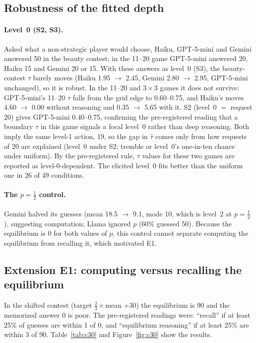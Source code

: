 \documentclass[11pt]{article}
\begin{document}
\subsection{Robustness of the fitted depth}
\paragraph{Level~0 (S2, S3).} Asked what a non-strategic player would choose, Haiku, GPT-5-mini and Gemini answered 50 in the beauty contest; in the 11--20 game GPT-5-mini answered 20, Haiku 15 and Gemini 20 or 15. With these answers as level~0 (S3), the beauty-contest $\tau$ barely moves (Haiku 1.95 $\to$ 2.45, Gemini 2.80 $\to$ 2.95, GPT-5-mini unchanged), so it is robust. In the 11--20 and $3{\times}3$ games it does not survive: GPT-5-mini's 11--20 $\tau$ falls from the grid edge to 0.60--0.75, and Haiku's moves 4.60 $\to$ 0.00 without reasoning and 0.35 $\to$ 5.65 with it. S2 (level~0 $=$ request 20) gives GPT-5-mini 0.40--0.75, confirming the pre-registered reading that a boundary $\tau$ in this game signals a focal level~0 rather than deep reasoning. Both imply the same level-1 action, 19, so the gap in $\hat\tau$ comes only from how requests of 20 are explained (level~0 under S2; tremble or level~0's one-in-ten chance under uniform). By the pre-registered rule, $\tau$ values for these two games are reported as level-0-dependent. The elicited level~0 fits better than the uniform one in 26 of 49 conditions.

\paragraph{The $p=\tfrac12$ control.} Gemini halved its guesses (mean 18.5 $\to$ 9.1, mode 10, which is level~2 at $p=\tfrac12$), suggesting computation; Llama ignored $p$ (60\% guessed 50). Because the equilibrium is 0 for both values of $p$, this control cannot separate computing the equilibrium from recalling it, which motivated E1.

\subsection{Extension E1: computing versus recalling the equilibrium}\label{sec:c30}
In the shifted contest (target $\tfrac23\times$mean $+30$) the equilibrium is 90 and the memorized answer 0 is poor. The pre-registered readings were: ``recall'' if at least 25\% of guesses are within 1 of 0, and ``equilibrium reasoning'' if at least 25\% are within 3 of 90. Table~\ref{tab:c30} and Figure~\ref{fig:c30} show the results.
\end{document}
